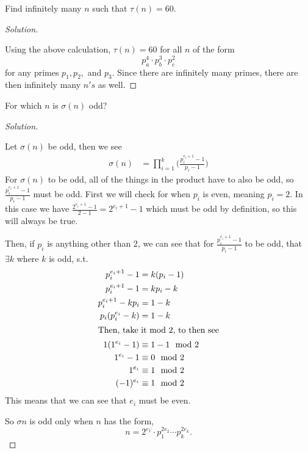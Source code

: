 \documentclass[11pt]{article}
\newenvironment{problem}[2][Problem]{\begin{trivlist}
\item[\hskip \labelsep {\bfseries #1}\hskip \labelsep {\bfseries #2.}]}{\end{trivlist}}
\newenvironment{solution}
  {\renewcommand\qedsymbol{$~$}\begin{proof}[Solution]$ $\par\nobreak\ignorespaces}
  {\end{proof}}
\begin{document}
\begin{problem}{10}
Find infinitely many $n$ such that $\tau(n)=60$.
\end{problem}

\begin{solution}
    Using the above calculation, $\tau(n)=60$ for all $n$ of the form
    \[
        p_a^4 \cdot p_b^3 \cdot p_c^2
    \]
    for any primes $p_1,p_2,$ and $p_3$. Since there are infinitely many primes, there are then infinitely many $n's$ as well.
\end{solution}




\begin{problem}{12}
For which $n$ is $\sigma(n)$ odd?
\end{problem}

\begin{solution}
    Let $\sigma(n)$ be odd, then we see
    \begin{align*}
        \sigma(n) & = \prod^{k}_{i=1} \bigg(\frac{p_i^{e_i+1}-1}{p_i-1}\bigg)
    \end{align*}
    For $\sigma(n)$ to be odd, all of the things in the product have to also be odd, so $\frac{p_i^{e_i+1}-1}{p_i-1}$ must be odd. First we will check for when $p_i$ is even, meaning $p_i=2$. In this case we have $\frac{2^{e_i+1}-1}{2-1}=2^{e_i+1}-1$ which must be odd by definition, so this will always be true.

    Then, if $p_i$ is anything other than 2, we can see that for $\frac{p_i^{e_i+1}-1}{p_i-1}$ to be odd, that $\exists k$ where $k$ is odd, s.t.
    \begin{align*}
        p_i^{e_i+1}-1     & = k(p_i-1)             \\
        p_i^{e_i+1}-1     & = kp_i-k               \\
        p_i^{e_i+1}-kp_i  & = 1-k                  \\
        p_i (p_i^{e_i}-k) & = 1-k                  \\
        \intertext{Then, take it mod 2, to then see}
        1 (1^{e_i}-1)     & \equiv 1- 1    \mod{2} \\
        1^{e_i} - 1       & \equiv 0 \mod{2}       \\
        1^{e_i}           & \equiv 1 \mod{2}       \\
        (-1)^{e_i}        & \equiv 1 \mod{2}       \\
    \end{align*}
    This means that we can see that $e_i$ must be even.

    So $\sigma{n}$ is odd only when $n$ has the form,
    \[
        n = 2^{e_1} \cdot p_1^{2e_2} \cdots p_k^{2e_k}.
    \]
\end{solution}
\end{document}
